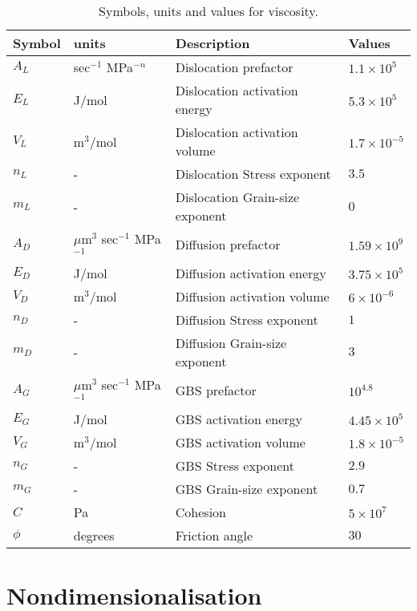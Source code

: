 \documentclass[a4paper]{article}
\begin{document}
\begin{table}[ht]
  \centering
  \begin{tabular}{llll}
    Symbol & units & Description & Values \\
    \hline
    $A_L$ & sec$^{-1}$ MPa$^{-n}$ & Dislocation prefactor &  $1.1 \times10^5$ \\
    $E_L$ & J/mol & Dislocation activation energy & $5.3 \times10^5$ \\
    $V_L$ & m$^3/$mol & Dislocation activation volume & $1.7 \times10^{-5}$ \\
    $n_L$ & - & Dislocation Stress exponent & $3.5$ \\
    $m_L$ & - & Dislocation Grain-size exponent & $0$ \\
    $A_D$ & $\mu$m$^3$ sec$^{-1}$ MPa$^{-1}$ & Diffusion prefactor &  $1.59 \times10^9$ \\
    $E_D$ & J/mol & Diffusion activation energy & $3.75 \times10^5$ \\
    $V_D$ & m$^3$/mol & Diffusion activation volume & $6 \times10^{-6}$ \\
    $n_D$ & - & Diffusion Stress exponent & $1$ \\
    $m_D$ & - & Diffusion Grain-size exponent & $3$ \\
    $A_G$ & $\mu$m$^3$ sec$^{-1}$ MPa$^{-1}$ & GBS prefactor &  $10^4.8$ \\
    $E_G$ & J/mol & GBS activation energy & $4.45 \times10^5$ \\
    $V_G$ & m$^3$/mol & GBS activation volume & $1.8 \times10^{-5}$ \\
    $n_G$ & - & GBS Stress exponent & $2.9$ \\
    $m_G$ & - & GBS Grain-size exponent & $0.7$ \\
    $C$ & Pa & Cohesion & $5 \times10^7$\\
    $\phi$ & degrees & Friction angle & $30$ \\
    \hline
  \end{tabular}
  \caption{Symbols, units and values for viscosity.}
  \label{tab:viscsymbols}
\end{table}


\section{Nondimensionalisation}
\end{document}
